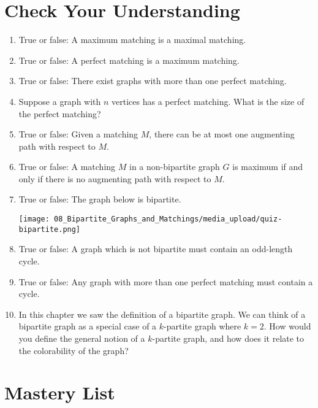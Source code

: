 

\section{Check Your Understanding}

\begin{enumerate}
    \item True or false: A maximum matching is a maximal matching.
    \item True or false: A perfect matching is a maximum matching.
    \item True or false: There exist graphs with more than one perfect matching.
    \item Suppose a graph with $n$ vertices has a perfect matching. What is the size of the perfect matching?
    \item True or false: Given a matching $M$, there can be at most one augmenting path with respect to $M$.
    \item True or false: A matching $M$ in a non-bipartite graph $G$ is maximum if and only if there is no augmenting path with respect to $M$.
    \item True or false: The graph below is bipartite.
    \begin{center}
        \texttt{[image: 08\_Bipartite\_Graphs\_and\_Matchings/media\_upload/quiz-bipartite.png]}
    \end{center}
    \item True or false: A graph which is not bipartite must contain an odd-length cycle.
    \item True or false: Any graph with more than one perfect matching must contain a cycle.
    \item In this chapter we saw the definition of a bipartite graph. We can think of a bipartite graph as a special case of a $k$-partite graph where $k = 2$. How would you define the general notion of a $k$-partite graph, and how does it relate to the colorability of the graph?
\end{enumerate}




\section{Mastery List}

